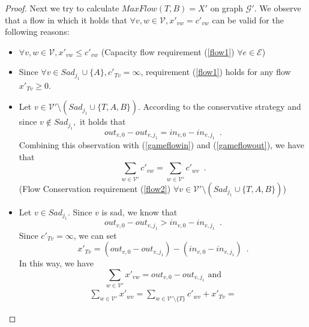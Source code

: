 \documentclass[11pt]{llncs}
\begin{document}
\begin{proof}
       Next we try to calculate $MaxFlow\left(T, B\right) = X'$ on graph $\mathcal{G}'$. We observe that a flow in which it
       holds that $\forall v, w \in \mathcal{V}, x'_{vw} = c'_{vw}$ can be valid for the following reasons:
       \begin{itemize}
          \item $\forall v,w \in \mathcal{V}, x'_{vw} \leq c'_{vw}$ (Capacity flow requirement (\ref{flow1}) $\forall e \in
          \mathcal{E}$)
          \item Since $\forall v \in Sad_{j_1} \cup \{A\}, c'_{Tv} = \infty$, requirement (\ref{flow1}) holds for any flow
          $x'_{Tv} \geq 0$.
          \item Let $v \in \mathcal{V}' \setminus \left(Sad_{j_1} \cup \{T, A, B\}\right)$. According to the conservative
          strategy and since $v \notin Sad_{j_1},$ it holds that
          \begin{equation}
             out_{v, 0} - out_{v, j_1} = in_{v, 0} - in_{v, j_1} \enspace.
          \end{equation}
          Combining this observation with (\ref{gameflowin}) and (\ref{gameflowout}), we have that
          \begin{equation}
             \sum\limits_{w \in \mathcal{V}'}c'_{vw} = \sum\limits_{w \in \mathcal{V}'}c'_{wv} \enspace.
          \end{equation}
          (Flow Conservation requirement (\ref{flow2}) $\forall v \in \mathcal{V}' \setminus \left(Sad_{j_1}
          \cup \{T, A, B\}\right)$)
          \item Let $v \in Sad_{j_1}$. Since $v$ is sad, we know that
          \begin{equation}
             out_{v, 0} - out_{v, j_1} > in_{v, 0} - in_{v, j_1} \enspace.
          \end{equation}
          Since $c'_{Tv} = \infty$, we can set
          \begin{equation}
             x'_{Tv} = \left(out_{v, 0} - out_{v, j_1}\right) - \left(in_{v, 0} - in_{v, j_1}\right) \enspace.
          \end{equation}
          In this way, we have
          \begin{equation}
             \sum\limits_{w \in \mathcal{V}'}x'_{vw} = out_{v, 0} - out_{v, j_1} \mbox{ and}
          \end{equation}
          \begin{equation}
          \begin{gathered}
             \sum\limits_{w \in \mathcal{V}'}x'_{wv} = \sum\limits_{w \in \mathcal{V}' \setminus \{T\}}c'_{wv} + x'_{Tv} =

\end{gathered}
\end{equation}
\end{itemize}
\end{proof}
\end{document}
